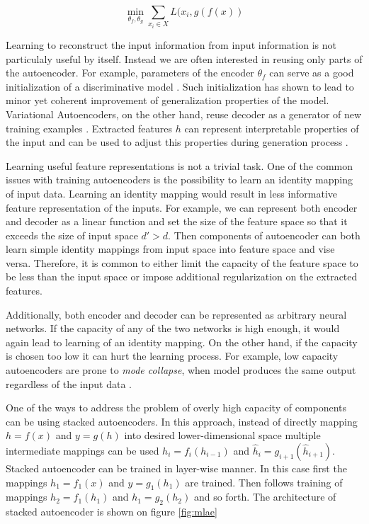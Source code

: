 \begin{equation}\label{eq:ae}
\min_{\theta_f, \theta_g}\sum\limits_{x_i \in X}{L(x_i, g(f(x))}
\end{equation}

Learning to reconstruct the input information from input information is not particulaly useful by itself.
Instead we are often interested in reusing only parts of the autoencoder.
For example, parameters of the encoder $\theta_f$ can serve as a good initialization of a discriminative model \cite{Masci2011, Vincent2010, Zhao2015}.
Such initialization has shown to lead to minor yet coherent improvement of generalization properties of the model.
Variational Autoencoders, on the other hand, reuse decoder as a generator of new training examples \cite{Kingma2013}.
Extracted features $h$ can represent interpretable properties of the input and can be used to adjust this
properties during generation process \cite{Kulkarni2015, Whitney2016}.

Learning useful feature representations is not a trivial task.
One of the common issues with training autoencoders is the possibility to learn an identity mapping of input data.
Learning an identity mapping would result in less informative feature representation of the inputs.
For example, we can represent both encoder and decoder as a linear function and set the size of the feature space so that it exceeds the size of input space $d' > d$.
Then components of autoencoder can both learn simple identity mappings from input space into feature space and vise versa.
Therefore, it is common to either limit the capacity of the feature space to be less than the input space or impose additional regularization on the extracted features.

Additionally, both encoder and decoder can be represented as arbitrary neural networks.
If the capacity of any of the two networks is high enough, it would again lead to learning of an identity mapping.
On the other hand, if the capacity is chosen too low it can hurt the learning process.
For example, low capacity autoencoders are prone to \textit{mode collapse}, when model produces the same output regardless of the input data \cite{Radford2015}.

One of the ways to address the problem of overly high capacity of components can be using stacked autoencoders.
In this approach, instead of directly mapping $h=f(x)$ and $y=g(h)$ into desired lower-dimensional space multiple intermediate mappings can be used $h_i=f_i(h_{i-1})$ and $\hat{h}_i=g_{i+1}(\hat{h}_{i+1})$.
Stacked autoencoder can be trained in layer-wise manner.
In this case first the mappings $h_1=f_1(x)$  and $y=g_1(h_1)$ are trained.
Then follows training of mappings $h_2=f_1(h_1)$ and $h_1=g_2(h_2)$ and so forth.
The architecture of stacked autoencoder is shown on figure \ref{fig:mlae}

